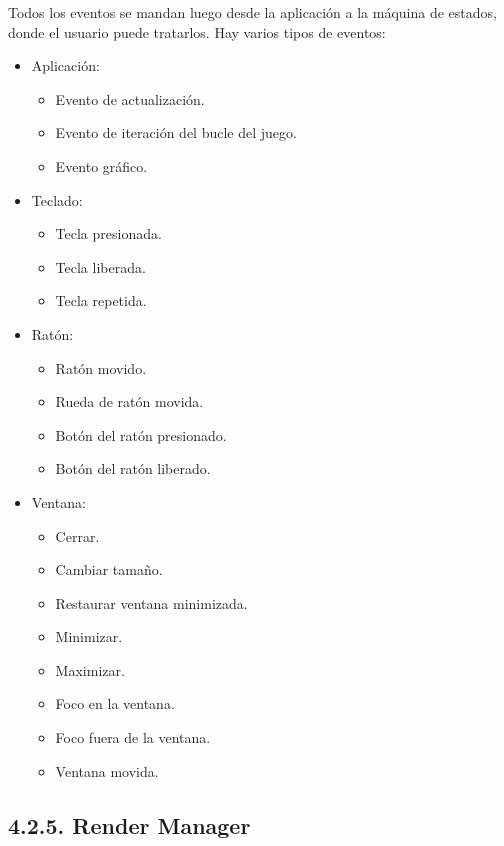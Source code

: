 Todos los eventos se mandan luego desde la aplicación a la máquina de estados, donde el usuario puede
tratarlos. Hay varios tipos de eventos:
\begin{itemize}
    \item Aplicación:
    \begin{itemize}
        \item Evento de actualización.
        \item Evento de iteración del bucle del juego.
        \item Evento gráfico.
    \end{itemize}
    \item Teclado:
    \begin{itemize}
        \item Tecla presionada.
        \item Tecla liberada.
        \item Tecla repetida.
    \end{itemize}
    \item Ratón:
    \begin{itemize}
        \item Ratón movido.
        \item Rueda de ratón movida.
        \item Botón del ratón presionado.
        \item Botón del ratón liberado.
    \end{itemize}
    \item Ventana:
    \begin{itemize}
        \item Cerrar.
        \item Cambiar tamaño.
        \item Restaurar ventana minimizada.
        \item Minimizar.
        \item Maximizar.
        \item Foco en la ventana.
        \item Foco fuera de la ventana.
        \item Ventana movida.
    \end{itemize}
\end{itemize}

\subsection*{4.2.5. Render Manager}\label{sec:workflow_managers_render}

